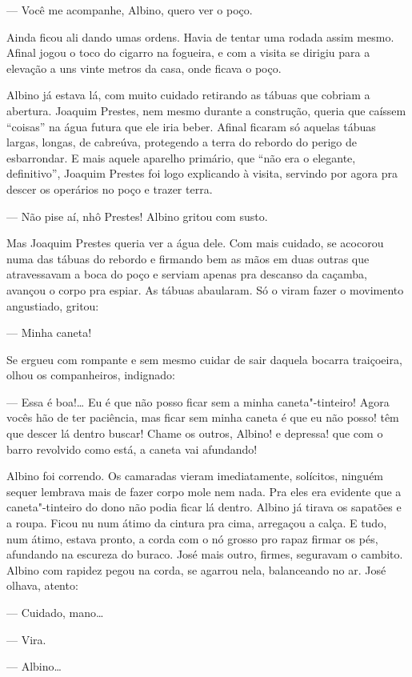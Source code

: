 --- Você me acompanhe, Albino, quero ver o poço.

Ainda ficou ali dando umas ordens. Havia de tentar uma rodada assim
mesmo. Afinal jogou o toco do cigarro na fogueira, e com a visita se
dirigiu para a elevação a uns vinte metros da casa, onde ficava o poço.

Albino já estava lá, com muito cuidado retirando as tábuas que cobriam a
abertura. Joaquim Prestes, nem mesmo durante a construção, queria que
caíssem ``coisas'' na água futura que ele iria beber. Afinal ficaram só
aquelas tábuas largas, longas, de cabreúva, protegendo a terra do
rebordo do perigo de esbarrondar. E mais aquele aparelho primário, que
``não era o elegante, definitivo'', Joaquim Prestes foi logo explicando
à visita, servindo por agora pra descer os operários no poço e trazer
terra.

--- Não pise aí, nhô Prestes! Albino gritou com susto.

Mas Joaquim Prestes queria ver a água dele. Com mais cuidado, se
acocorou numa das tábuas do rebordo e firmando bem as mãos em duas
outras que atravessavam a boca do poço e serviam apenas pra descanso da
caçamba, avançou o corpo pra espiar. As tábuas abaularam. Só o viram
fazer o movimento angustiado, gritou:

--- Minha caneta!

Se ergueu com rompante e sem mesmo cuidar de sair daquela bocarra
traiçoeira, olhou os companheiros, indignado:

--- Essa é boa!\ldots{} Eu é que não posso ficar sem a minha caneta"-tinteiro!
Agora vocês hão de ter paciência, mas ficar sem minha caneta é que eu
não posso! têm que descer lá dentro buscar! Chame os outros, Albino! e
depressa! que com o barro revolvido como está, a caneta vai afundando!

Albino foi correndo. Os camaradas vieram imediatamente, solícitos,
ninguém sequer lembrava mais de fazer corpo mole nem nada. Pra eles era
evidente que a caneta"-tinteiro do dono não podia ficar lá dentro. Albino
já tirava os sapatões e a roupa. Ficou nu num átimo da cintura pra cima,
arregaçou a calça. E tudo, num átimo, estava pronto, a corda com o nó
grosso pro rapaz firmar os pés, afundando na escureza do buraco. José
mais outro, firmes, seguravam o cambito. Albino com rapidez pegou na
corda, se agarrou nela, balanceando no ar. José olhava, atento:

--- Cuidado, mano\ldots{}

--- Vira.

--- Albino\ldots{}


